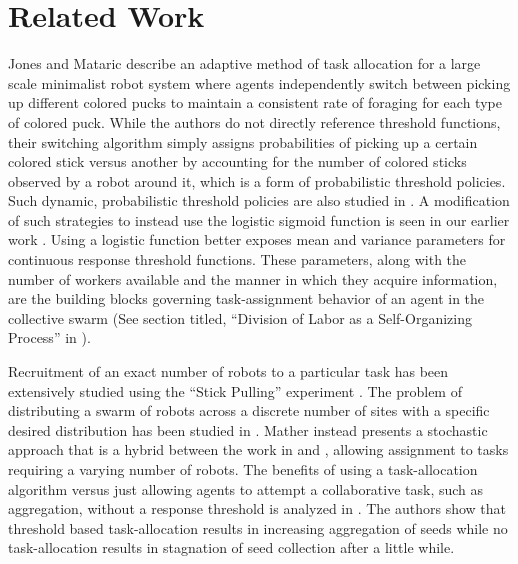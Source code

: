 \documentclass[conference]{ieeeconf}
\begin{document}
\section{Related Work}\label{subsec:rw}
Jones and Mataric \cite{Jones2004} describe an adaptive method of task allocation for a large scale minimalist robot system where agents independently switch between picking up different colored pucks to maintain a consistent rate of foraging for each type of colored puck. While the authors do not directly reference threshold functions, their switching algorithm simply assigns probabilities of picking up a certain colored stick versus another by accounting for the number of colored sticks observed by a robot around it, which is a form of probabilistic threshold policies. Such dynamic, probabilistic threshold policies are also studied in \cite{Nouyan2002, Bonabeau1996, Bonabeau1997}. A modification of such strategies to instead use the logistic sigmoid function is seen in our earlier work \cite{Kanakia2014}. Using a logistic function better exposes mean and variance parameters for continuous response threshold functions. These parameters, along with the number of workers available and the manner in which they acquire information, are the building blocks governing task-assignment behavior of an agent in the collective swarm (See section titled, ``Division of Labor as a Self-Organizing Process'' in \cite{Robinson1992}). 

Recruitment of an exact number of robots to a particular task has been extensively studied using the ``Stick Pulling'' experiment \cite{Lerman2001,Martinoli2004}. The problem of distributing a swarm of robots across a discrete number of sites with a specific desired distribution has been studied in \cite{Berman2009,Correll2008}. Mather \cite{Mather2010} instead presents a stochastic approach that is a hybrid between the work in \cite{Berman2009} and \cite{Martinoli2004}, allowing assignment to tasks requiring a varying number of robots. The benefits of using a task-allocation algorithm versus just allowing agents to attempt a collaborative task, such as aggregation, without a response threshold is analyzed in \cite{Agassounon2001}. The authors show that threshold based task-allocation results in increasing aggregation of seeds while no task-allocation results in stagnation of seed collection after a little while.
\end{document}
